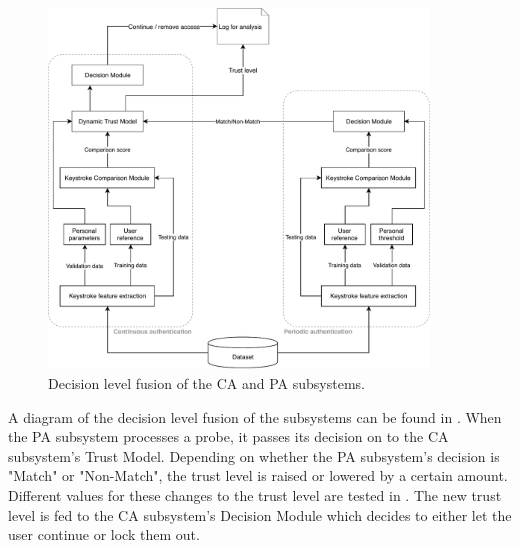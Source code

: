 \begin{figure}[ht]
    \centering
    \includegraphics[width=0.9\textwidth]{figures/system-diagram-decisionlvl.pdf}
    \caption{Decision level fusion of the CA and PA subsystems. }
    \label{fig:decisionlvl}
\end{figure}

A diagram of the decision level fusion of the subsystems can be found in .
When the PA subsystem processes a probe, it passes its decision on to the CA subsystem's Trust Model.
Depending on whether the PA subsystem's decision is "Match" or "Non-Match", the trust level is raised or lowered by a certain amount.
Different values for these changes to the trust level are tested in .
The new trust level is fed to the CA subsystem's Decision Module which decides to either let the user continue or lock them out.


